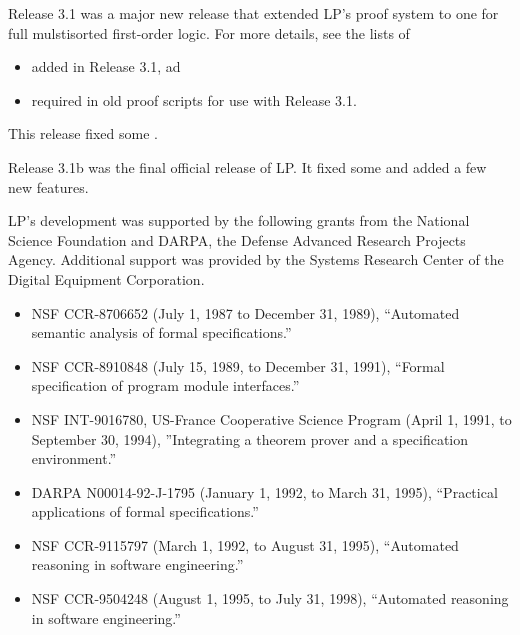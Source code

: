 Release 3.1 was a major new release that  extended LP's proof system to one for
full mulstisorted first-order logic.  For more details, see the lists of
\begin{itemize}
\item 
{} added in Release 3.1, ad
\item 
{} required in old proof scripts for use with
Release 3.1.
\end{itemize}

This release fixed some .

Release 3.1b was the final official release of LP.  It fixed
some  and added a few new features. 


LP's development was supported by the following grants from the National Science
Foundation and DARPA, the Defense Advanced Research Projects Agency.  Additional
support was provided by the Systems Research Center of the Digital Equipment
Corporation.
\begin{itemize}
\item NSF CCR-8706652 (July 1, 1987 to December 31, 1989), ``Automated semantic
analysis of formal specifications.''
\item NSF CCR-8910848 (July 15, 1989, to December 31, 1991), ``Formal
specification of program module interfaces.''
\item NSF INT-9016780, US-France Cooperative Science Program (April 1, 1991, to
September 30, 1994), ''Integrating a theorem prover and a specification
environment.'' 
\item DARPA N00014-92-J-1795 (January 1, 1992, to March 31, 1995), ``Practical
applications of formal specifications.''
\item NSF CCR-9115797 (March 1, 1992, to August 31, 1995), ``Automated reasoning
in software engineering.''
\item NSF CCR-9504248 (August 1, 1995, to July 31, 1998), ``Automated reasoning
in software engineering.''
\end{itemize}
